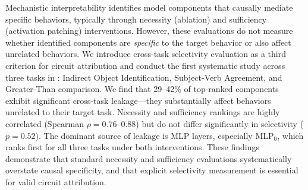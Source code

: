 Mechanistic interpretability identifies model components that causally mediate specific behaviors, typically through necessity (ablation) and sufficiency (activation patching) interventions. However, these evaluations do not measure whether identified components are \emph{specific} to the target behavior or also affect unrelated behaviors. We introduce cross-task selectivity evaluation as a third criterion for circuit attribution and conduct the first systematic study across three tasks in \gptsmall: Indirect Object Identification, Subject-Verb Agreement, and Greater-Than comparison. We find that 29--42\% of top-ranked components exhibit significant cross-task leakage---they substantially affect behaviors unrelated to their target task. Necessity and sufficiency rankings are highly correlated (Spearman $\rho = 0.76$--$0.88$) but do not differ significantly in selectivity ($p = 0.52$). The dominant source of leakage is MLP layers, especially MLP$_0$, which ranks first for all three tasks under both interventions. These findings demonstrate that standard necessity and sufficiency evaluations systematically overstate causal specificity, and that explicit selectivity measurement is essential for valid circuit attribution.